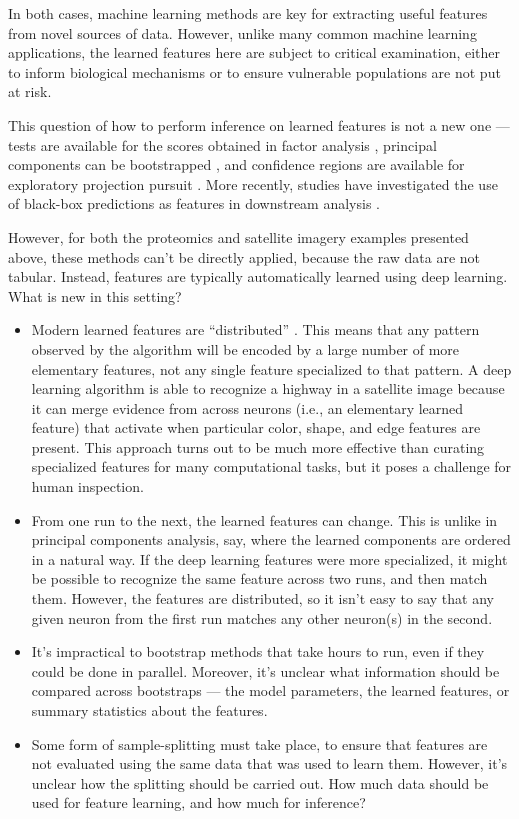 In both cases, machine learning methods are key for extracting useful features
from novel sources of data. However, unlike many common machine learning
applications, the learned features here are subject to critical examination,
either to inform biological mechanisms or to ensure vulnerable populations are
not put at risk.

This question of how to perform inference on learned features is not a new one —
tests are available for the scores obtained in factor analysis \cite{rao1955estimation},
principal components can be bootstrapped \cite{diaconis1983computer}, and
confidence regions are available for exploratory projection pursuit
\cite{elguero1988confidence}. More recently, studies have investigated the use
of black-box predictions as features in downstream analysis
\citep{wang2020methods}.

However, for both the proteomics and satellite imagery examples presented above,
these methods can't be directly applied, because the raw data are not tabular.
Instead, features are typically automatically learned using deep learning. What
is new in this setting?

\begin{itemize}
\item Modern learned features are ``distributed'' \cite{mcclelland1986parallel}.
  This means that any pattern observed by the algorithm will be encoded by a
  large number of more elementary features, not any single feature specialized
  to that pattern. A deep learning algorithm is able to recognize a highway in a
  satellite image because it can merge evidence from across neurons (i.e., an
  elementary learned feature) that activate when particular color, shape, and
  edge features are present. This approach turns out to be much more effective
  than curating specialized features for many computational tasks, but it poses
  a challenge for human inspection.
\item From one run to the next, the learned features can change. This is unlike
  in principal components analysis, say, where the learned components are
  ordered in a natural way. If the deep learning features were more specialized,
  it might be possible to recognize the same feature across two runs, and then
  match them. However, the features are distributed, so it isn’t easy to say
  that any given neuron from the first run matches any other neuron(s) in the
  second.
\item It’s impractical to bootstrap methods that take hours to run, even if they
  could be done in parallel. Moreover, it’s unclear what information should be
  compared across bootstraps — the model parameters, the learned features, or
  summary statistics about the features.
\item Some form of sample-splitting must take place, to ensure that features are
  not evaluated using the same data that was used to learn them. However, it’s
  unclear how the splitting should be carried out. How much data should be used
  for feature learning, and how much for inference?
\end{itemize}

